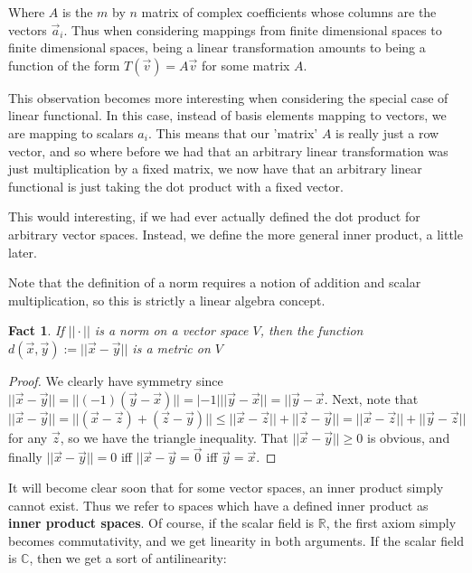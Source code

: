 \documentclass{article}
\theoremstyle{definition}
\theoremstyle{plain}
\theoremstyle{theorem}
\newtheorem{fact}{Fact}[section]
\begin{document}
Where $A$ is the $m$ by $n$ matrix of complex coefficients whose columns are the vectors $\vec{a}_i$. Thus when considering mappings from finite dimensional spaces to finite dimensional spaces, being a linear transformation amounts to being a function of the form $T(\vec{v}) = A\vec{v}$ for some matrix $A$. 
\par This observation becomes more interesting when considering the special case of linear functional. In this case, instead of basis elements mapping to vectors, we are mapping to scalars $a_i$. This means that our 'matrix' $A$ is really just a row vector, and so where before we had that an arbitrary linear transformation was just multiplication by a fixed matrix, we now have that an arbitrary linear functional is just taking the dot product with a fixed vector. 
\par This would interesting, if we had ever actually defined the dot product for arbitrary vector spaces. Instead, we define the more general inner product, a little later.

	Note that the definition of a norm requires a notion of addition and scalar multiplication, so this is strictly a linear algebra concept. 
	\begin{fact}
		If $||\cdot||$ is a norm on a vector space $V$, then the function $d(\vec{x},\vec{y}) := ||\vec{x}-\vec{y}||$ is a metric on $V$
	\end{fact}
	\begin{proof}
		We clearly have symmetry since $||\vec{x}-\vec{y}|| = ||(-1)(\vec{y}-\vec{x})|| = |-1|||\vec{y}-\vec{x}|| = ||\vec{y}-\vec{x}$. Next, note that		
		$||\vec{x}-\vec{y}|| = ||(\vec{x}-\vec{z})+(\vec{z}-\vec{y})|| \leq ||\vec{x}-\vec{z}|| + ||\vec{z}-\vec{y}|| = ||\vec{x}-\vec{z}||+||\vec{y}-\vec{z}||$ for any $\vec{z}$, so we have the triangle inequality. That $||\vec{x}-\vec{y}|| \geq 0$ is obvious, and finally $||\vec{x} - \vec{y}|| = 0$ iff $||\vec{x}-\vec{y}=\vec{0}$ iff $\vec{y} = \vec{x}$. 
	\end{proof}

	It will become clear soon that for some vector spaces, an inner product simply cannot exist. Thus we refer to spaces which have a defined inner product as \textbf{inner product spaces}. Of course, if the scalar field is $\mathbb{R}$, the first axiom simply becomes commutativity, and we get linearity in both arguments. If the scalar field is $\mathbb{C}$, then we get a sort of antilinearity:
\end{document}
